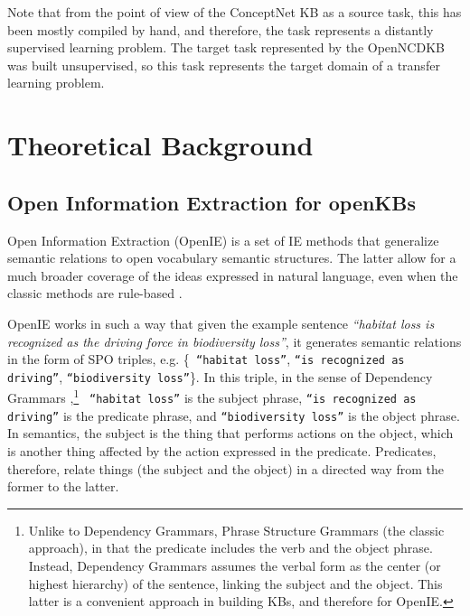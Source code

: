 \documentclass[preprint]{elsarticle}
\begin{document}
Note that from the point of view of the ConceptNet KB as a source task, this has been mostly compiled by hand, and therefore, the task represents a distantly supervised learning problem. The target task represented by the OpenNCDKB was built unsupervised, so this task represents the target domain of a transfer learning problem.

\section{Theoretical Background}\label{sec:03_theoretical_background}

\subsection{Open Information Extraction for openKBs}
\label{sec:oie}
Open Information Extraction (OpenIE) is a set of IE methods that generalize semantic relations to open vocabulary semantic structures. The latter allow for a much broader coverage of the ideas expressed in natural language, even when the classic methods are rule-based \cite{etzioni2008open,fader2011identifying}.

OpenIE works in such a way that given the example sentence \textit{``habitat loss is recognized as the driving force in biodiversity loss''}, it generates semantic relations in the form of SPO triples, e.g. \{\texttt{
``habitat loss''}, \texttt{``is recognized as driving''}, \texttt{``biodiversity loss''}\}. In this triple, in the sense of Dependency Grammars \cite{10.2307/411934},\footnote{Unlike to Dependency Grammars, Phrase Structure Grammars (the classic approach), in that the predicate includes the verb and the object phrase. Instead, Dependency Grammars assumes the verbal form as the center (or highest hierarchy) of the sentence, linking the subject and the object. This latter is a convenient approach in building KBs, and therefore for OpenIE.} \texttt{
``habitat loss''} is the subject phrase, \texttt{``is recognized as driving''} is the predicate phrase, and \texttt{``biodiversity loss''} is the object phrase. In semantics, the subject is the thing that performs actions on the object, which is another thing affected by the action expressed in the predicate. Predicates, therefore, relate things (the subject and the object) in a directed way from the former to the latter.
\end{document}
